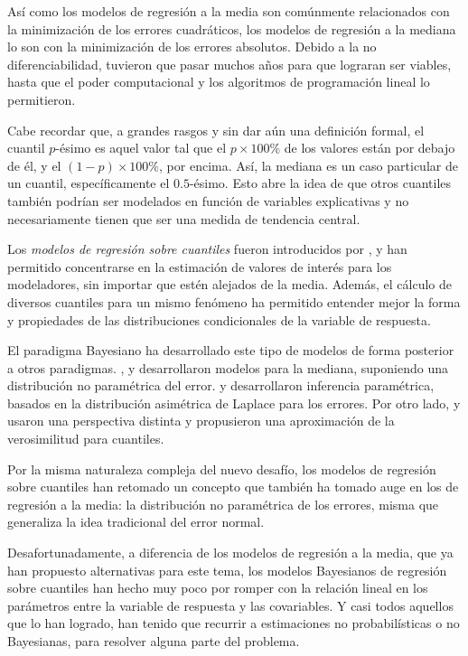 As\'i como los modelos de regresi\'on a la media son com\'unmente relacionados con la minimizaci\'on de los errores cuadr\'aticos, los modelos de regresi\'on a la mediana lo son con la minimizaci\'on de los errores absolutos. Debido a la no diferenciabilidad, tuvieron que pasar muchos años para que lograran ser viables, hasta que el poder computacional y los algoritmos de programaci\'on lineal lo permitieron.

Cabe recordar que, a grandes rasgos y sin dar a\'un una definici\'on formal, el cuantil $p$-\'esimo es aquel valor tal que el $p \times 100\%$ de los valores est\'an por debajo de \'el, y el $(1-p)\times 100\%$, por encima. As\'i, la mediana es un caso particular de un cuantil, espec\'ificamente el $0.5$-\'esimo. Esto abre la idea de que otros cuantiles tambi\'en podr\'ian ser modelados en funci\'on de variables explicativas y no necesariamente tienen que ser una medida de tendencia central. 

Los \textit{modelos de regresi\'on sobre cuantiles} fueron introducidos por \cite{Koenker_QuantReg}, y han permitido concentrarse en la estimaci\'on de valores de inter\'es para los modeladores, sin importar que est\'en alejados de la media. Adem\'as, el c\'alculo de diversos cuantiles para un mismo fen\'omeno ha permitido entender mejor la forma y propiedades de las distribuciones condicionales de la variable de respuesta.

El paradigma Bayesiano ha desarrollado este tipo de modelos de forma posterior a otros paradigmas. \cite{Walker_BayesAccFail}, \cite{Kottas_BaySemiparamMed} y \cite{Hanson_PolyaTrees} desarrollaron modelos para la mediana, suponiendo una distribuci\'on no param\'etrica del error. \cite{Yu_BayQuantReg} y \cite{Tsionas_BayQuantInf} desarrollaron inferencia param\'etrica, basados en la distribuci\'on asim\'etrica de Laplace para los errores. Por otro lado, \cite{Lavine_LikeQuant} y \cite{Dunson_ApproxBayes} usaron una perspectiva distinta y propusieron una aproximaci\'on de la verosimilitud para cuantiles.

Por la misma naturaleza compleja del nuevo desaf\'io, los modelos de regresi\'on sobre cuantiles han retomado un concepto que tambi\'en ha tomado auge en los de regresi\'on a la media: la distribuci\'on no param\'etrica de los errores, misma que generaliza la idea tradicional del error normal. 

Desafortunadamente, a diferencia de los modelos de regresi\'on a la media, que ya han propuesto alternativas para este tema, los modelos Bayesianos de regresi\'on sobre cuantiles han hecho muy poco por romper con la relaci\'on lineal en los par\'ametros entre la variable de respuesta y las covariables. Y casi todos aquellos que lo han logrado, han tenido que recurrir a estimaciones no probabil\'isticas o no Bayesianas, para resolver alguna parte del problema.

